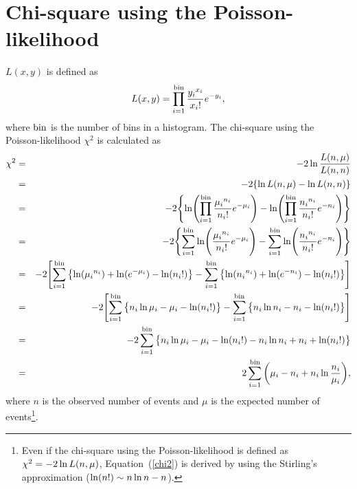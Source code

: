
%
%

\section{Chi-square using the Poisson-likelihood}\label{App_likelihood}
\vs\hs
$L(x,y)$ is defined as
\begin{eqnarray}
	L(x,y)=\prod_{i=1}^{{\rm bin}} {{y_{i}}^{x_{i}} \over x_{i}!}e^{-y_{i}},
\end{eqnarray}
where ${\rm bin}$ is the number of bins in a histogram.
The chi-square using the Poisson-likelihood $\chi^{2}$ is calculated as
\begin{eqnarray}
	\chi^{2}&=&-2\,{\rm ln}\,{L(n,\mu) \over L(n,n)} \nonumber\\
					&=&-2\{{\rm ln}\,L(n,\mu) - {\rm ln}\,L(n,n)\} \nonumber\\
					&=&-2\Biggl\{{\rm ln}\Biggl(\prod_{i=1}^{{\rm bin}} {{\mu_{i}}^{n_{i}} \over n_{i}!}e^{-\mu_{i}}\Biggr) - {\rm ln}\Biggl(\prod_{i=1}^{{\rm bin}} {{n_{i}}^{n_{i}} \over n_{i}!}e^{-n_{i}}\Biggr)\Biggr\} \nonumber\\
					&=&-2\Biggl\{\sum_{i=1}^{{\rm bin}} {\rm ln}\Biggl({{\mu_{i}}^{n_{i}} \over n_{i}!}e^{-\mu_{i}}\Biggr) - \sum_{i=1}^{{\rm bin}} {\rm ln}\Biggl({{n_{i}}^{n_{i}} \over n_{i}!}e^{-n_{i}}\Biggr)\Biggr\} \nonumber\\
					&=&-2\Biggl[\sum_{i=1}^{{\rm bin}} \big\{{\rm ln}({\mu_{i}}^{n_{i}}) + {\rm ln}(e^{-\mu_{i}}) - {\rm ln}(n_{i}!)\big\} - \sum_{i=1}^{{\rm bin}} \big\{{\rm ln}({n_{i}}^{n_{i}}) + {\rm ln}(e^{-n_{i}}) - {\rm ln}(n_{i}!)\big\}\Biggr] \nonumber\\
					&=&-2\Biggl[\sum_{i=1}^{{\rm bin}} \big\{n_{i}\,{\rm ln}\,\mu_{i} - \mu_{i} - {\rm ln}(n_{i}!)\big\} - \sum_{i=1}^{{\rm bin}} \big\{n_{i}\,{\rm ln}\,n_{i} - n_{i} - {\rm ln}(n_{i}!)\big\}\Biggr] \nonumber\\
					&=&-2\sum_{i=1}^{{\rm bin}} \big\{n_{i}\,{\rm ln}\,\mu_{i} - \mu_{i} - {\rm ln}(n_{i}!) - n_{i}\,{\rm ln}\,n_{i} + n_{i} + {\rm ln}(n_{i}!)\big\} \nonumber\\
					&=&2\sum_{i=1}^{{\rm bin}} \bigg(\mu_{i} - n_{i} + n_{i}\,{\rm ln}\,{n_{i} \over \mu_{i}}\bigg), \label{chi2}
\end{eqnarray}
where $n$ is the observed number of events and $\mu$ is the expected number of events\footnote{Even if the chi-square using the Poisson-likelihood is defined as $\chi^{2}=-2\,{\rm ln}\,L(n,\mu)$, Equation~(\ref{chi2}) is derived by using the Stirling's approximation (${\rm ln}(n!) \sim n\,{\rm ln}\,n - n$).}.





\newpage


